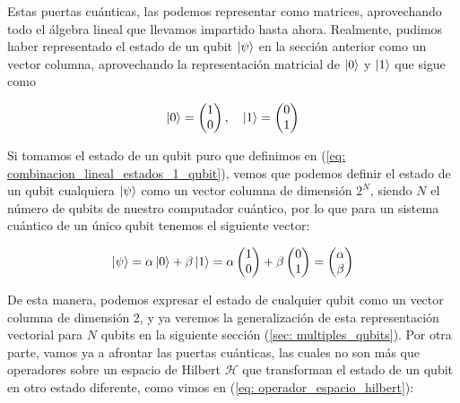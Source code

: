 \documentclass{article}
\numberwithin{equation}{section} %
\begin{document}
    \vspace{5mm}

    Estas puertas cuánticas, las podemos representar como matrices, aprovechando todo el álgebra lineal que llevamos impartido hasta ahora. Realmente, pudimos haber representado el estado de un qubit \( \ket{\psi} \) en la sección anterior como un vector columna, aprovechando la representación matricial de \( \ket{0} \) y \( \ket{1} \) que sigue como

    \begin{equation}
        \ket{0} = \begin{pmatrix}
            1 \\
            0
        \end{pmatrix}
        , \quad \ket{1} = \begin{pmatrix}
            0 \\
            1
        \end{pmatrix}
    \end{equation}

    \vspace{2.5mm}

    Si tomamos el estado de un qubit puro que definimos en (\ref{eq: combinacion_lineal_estados_1_qubit}), vemos que podemos definir el estado de un qubit cualquiera \( \ket{\psi} \) como un vector columna de dimensión \( 2^{N} \), siendo \( N \) el número de qubits de nuestro computador cuántico, por lo que para un sistema cuántico de un único qubit tenemos el siguiente vector:

    \begin{equation}
        \ket{\psi} = \alpha \ket{0} + \beta \ket{1} = \alpha \begin{pmatrix}
        1 \\
        0
        \end{pmatrix} + \beta \begin{pmatrix}
        0 \\
        1
        \end{pmatrix} = \begin{pmatrix}
        \alpha \\
        \beta
        \end{pmatrix}
        \label{eq: vector_sistema_un_qubit}
    \end{equation}

    \vspace{2.5mm}

    De esta manera, podemos expresar el estado de cualquier qubit como un vector columna de dimensión 2, y ya veremos la generalización de esta representación vectorial para \( N \) qubits en la siguiente sección (\ref{sec: multiples_qubits}). Por otra parte, vamos ya a afrontar las puertas cuánticas, las cuales no son más que operadores sobre un espacio de Hilbert \( \mathcal{H} \) que transforman el estado de un qubit en otro estado diferente, como vimos en (\ref{eq: operador_espacio_hilbert}):
\end{document}
